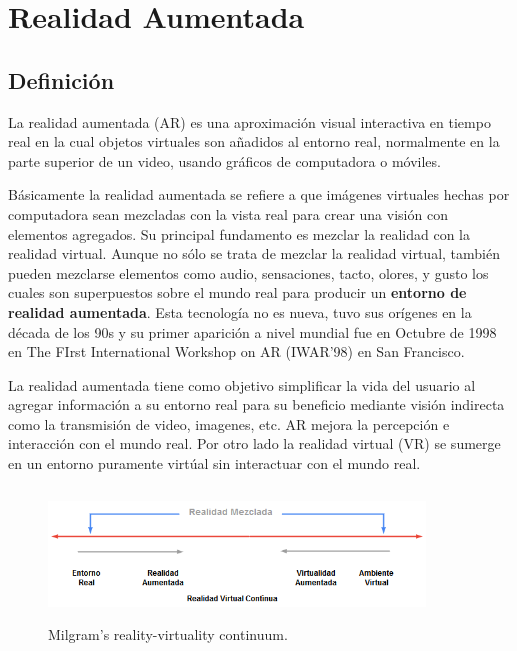 \newpage
\section{Realidad Aumentada}
\setcounter{secnumdepth}{2}

\subsection{Definición}
La realidad aumentada (AR) es una aproximación visual interactiva en tiempo real en la cual objetos virtuales son añadidos al entorno real, normalmente en la parte superior de un video, usando gráficos de computadora o móviles.\cite{B04} \par
\vspace{5mm}
Básicamente la realidad aumentada se refiere a que imágenes virtuales hechas por computadora sean mezcladas con la vista real para crear una visión con elementos agregados. Su principal fundamento es mezclar la realidad con la realidad virtual. Aunque no sólo se trata de mezclar la realidad virtual, también pueden mezclarse elementos como audio, sensaciones, tacto, olores, y gusto los cuales son superpuestos sobre el mundo real para producir un \textbf{entorno de realidad aumentada}.\cite{B05}
Esta tecnología no es nueva, tuvo sus orígenes en la década de los 90s\cite{B04} y su primer aparición a nivel mundial fue en Octubre de 1998 en The FIrst International Workshop on AR (IWAR'98) en San Francisco\cite{B05}.\par 
\vspace{5mm}
La realidad aumentada tiene como objetivo simplificar la vida del usuario al agregar información a su entorno real para su beneficio mediante visión indirecta como la transmisión de video, imagenes, etc. AR mejora la percepción e interacción con el mundo real. Por otro lado la realidad virtual (VR) se sumerge en un entorno puramente virtúal sin interactuar con el mundo real.\cite{B27}\par
\begin{figure}[h!]
	\centering
	\includegraphics[width=10cm,height=3.5cm]{imagenes/marcoteorico/ar/Mixed_Reallity.png}
	\caption{Milgram’s reality-virtuality continuum.\cite{B27}}
	\label{fig:analogo}
\end{figure}
